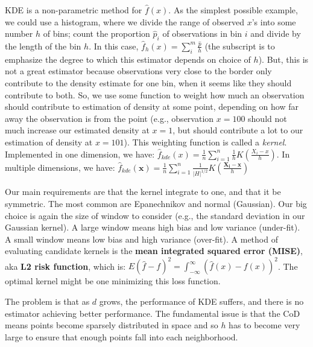 \documentclass{article}
\begin{document}
KDE is a non-parametric method for $\hat{f}(x)$. As the simplest possible
example, we could use a histogram, where we divide the range of observed $x$'s
into some number $h$ of bins; count the proportion $\hat{p}_i$ of observations
in bin $i$ and divide by the length of the bin $h$. In this case, $\hat{f}_h(x)
= \sum_i^{m}\frac{\hat{p}}{h}$
(the subscript is to emphasize the degree to which this estimator depends on
choice of $h$). But, this is not a great estimator because observations very
close to the border only contribute to the density estimate for one bin, when it
seems like they should contribute to both. So, we use some function to weight
how much an observation should contribute to estimation of density at some
point, depending on how far away the observation is from the point (e.g.,
observation $x=100$ should not much increase our estimated density at $x=1$, but
should contribute a lot to our estimation of density at $x=101$). This weighting
function is called a \textit{kernel}. Implemented in one dimension, we have: $\hat{f}_{kde}(x) =
\frac{1}{n}\sum_{i=1}^{n}\frac{1}{h}K(\frac{X_i - x}{h})$. In multiple
dimensions, we have: $\hat{f}_{kde}(\mathbf{x}) =  \frac{1}{n}\sum_{i=1}^n
\frac{1}{|H|^{1/2}}K(\frac{\mathbf{X_i}-\mathbf{x}}{h})$

Our main requirements are that the kernel integrate to one, and that it be
symmetric. The most common are Epanechnikov and normal (Gaussian). Our big
choice is again the size of window to consider (e.g., the standard deviation in
our Gaussian kernel). A large window means high bias and low variance
(under-fit). A small window means low bias and high variance (over-fit). A
method of evaluating candidate kernels is the \textbf{mean integrated squared
error (MISE)}, aka \textbf{L2 risk function}, which is: $E(\hat{f} - f)^2 =
\int_{-\infty}^\infty (\hat{f}(x) -f(x))^2$. The optimal kernel might be one
minimizing this loss function. 

The problem is that as $d$ grows, the performance of KDE suffers, and there is
no estimator achieving better performance. The fundamental issue is that the CoD
means points become sparsely distributed in space and so $h$ has to become very
large to ensure that enough points fall into each neighborhood. 

\medskip
\end{document}

